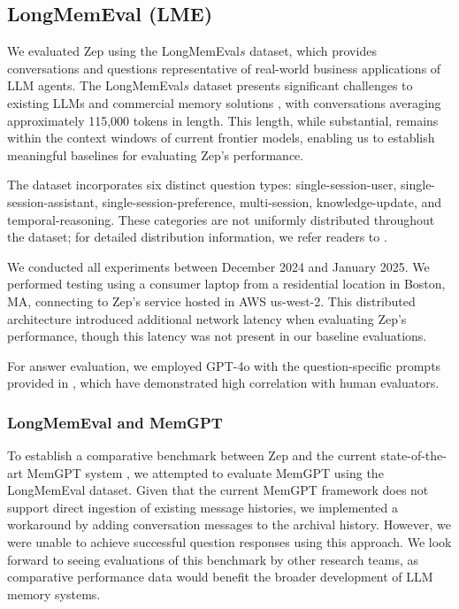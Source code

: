\documentclass{article}
\begin{document}
\subsection{LongMemEval (LME)}
We evaluated Zep using the LongMemEval${s}$ dataset, which provides conversations and questions representative of real-world business applications of LLM agents. The LongMemEval${s}$ dataset presents significant challenges to existing LLMs and commercial memory solutions \cite{longmemeval}, with conversations averaging approximately 115,000 tokens in length. This length, while substantial, remains within the context windows of current frontier models, enabling us to establish meaningful baselines for evaluating Zep's performance.

The dataset incorporates six distinct question types: single-session-user, single-session-assistant, single-session-preference, multi-session, knowledge-update, and temporal-reasoning. These categories are not uniformly distributed throughout the dataset; for detailed distribution information, we refer readers to \cite{longmemeval}.

We conducted all experiments between December 2024 and January 2025. We performed testing using a consumer laptop from a residential location in Boston, MA, connecting to Zep's service hosted in AWS us-west-2. This distributed architecture introduced additional network latency when evaluating Zep's performance, though this latency was not present in our baseline evaluations. 

For answer evaluation, we employed GPT-4o with the question-specific prompts provided in \cite{longmemeval}, which have demonstrated high correlation with human evaluators.

\subsubsection{LongMemEval and MemGPT}
To establish a comparative benchmark between Zep and the current state-of-the-art MemGPT system \cite{memgpt}, we attempted to evaluate MemGPT using the LongMemEval dataset. Given that the current MemGPT framework does not support direct ingestion of existing message histories, we implemented a workaround by adding conversation messages to the archival history. However, we were unable to achieve successful question responses using this approach. We look forward to seeing evaluations of this benchmark by other research teams, as comparative performance data would benefit the broader development of LLM memory systems.
\end{document}
